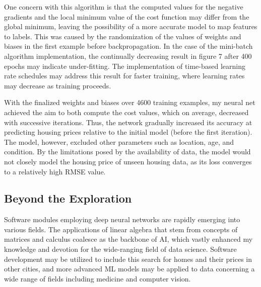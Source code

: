 \documentclass[12pt,a4paper]{article}
\begin{document}
One concern with this algorithm is that the computed values for the negative gradients and the local minimum value of the cost function may differ from the global minimum, leaving the possibility of a more accurate model to map features to labels. This was caused by the randomization of the values of weights and biases in the first example before backpropagation. In the case of the mini-batch algorithm implementation, the continually decreasing result in figure 7 after 400 epochs may indicate under-fitting. The implementation of time-based learning rate schedules may address this result for faster training, where learning rates may decrease as training proceeds.


With the finalized weights and biases over 4600 training examples, my neural net achieved the aim to both compute the cost values, which on average, decreased with successive iterations. Thus, the network gradually increased its accuracy at predicting housing prices relative to the initial model (before the first iteration). The model, however, excluded other parameters such as location, age, and condition. By the limitations posed by the availability of data, the model would not closely model the housing price of unseen housing data, as its loss converges to a relatively high RMSE value.


\subsection{Beyond the Exploration}
Software modules employing deep neural networks are rapidly emerging into various fields. The applications of linear algebra that stem from concepts of matrices and calculus coalesce as the backbone of AI, which vastly enhanced my knowledge and devotion for the wide-ranging field of data science. Software development may be utilized to include this search for homes and their prices in other cities, and more advanced ML models may be applied to data concerning a wide range of fields including medicine and computer vision.
\end{document}
